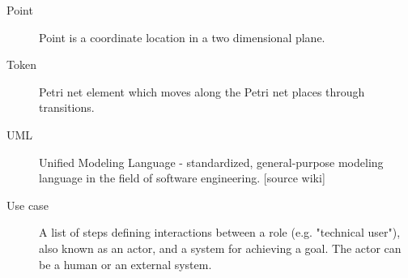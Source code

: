 \begin{description}
\item [Point] Point is a coordinate location in a two dimensional plane.

\item [Token] Petri net element which moves along the Petri net places through transitions.

\item [UML] Unified Modeling Language - standardized, general-purpose modeling language in the field of software engineering. [source wiki]

\item [Use case] A list of steps defining interactions between a role (e.g. "technical user"), also known as an actor, and a system for achieving a goal. The actor can be a human or an external system.





 \end{description}
